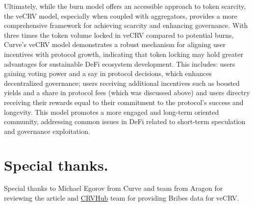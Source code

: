 \documentclass[notitlepage]{revtex4-2}
\begin{document}
Ultimately, while the burn model offers an accessible approach to token scarcity, the veCRV model, especially when
coupled with aggregators, provides a more comprehensive framework for achieving scarcity and enhancing governance.
With three times the token volume locked in veCRV compared to potential burns, Curve’s veCRV model demonstrates a
robust mechanism for aligning user incentives with protocol growth, indicating that token locking may hold greater
advantages for sustainable DeFi ecosystem development. This includes: users gaining voting power and a say in protocol
decisions, which enhances decentralized governance; users receiving additional incentives such as boosted yields and a
share in protocol fees (which was discussed above) and users directry receiving their rewards equal to their commitment
to the protocol’s success and longevity. This model promotes a more engaged and long-term oriented community,
addressing common issues in DeFi related to short-term speculation and governance exploitation.

\section{Special thanks.}

Special thanks to Michael Egorov from Curve and team from Aragon for reviewing the article and
\href{https://crvhub.com}{CRVHub} team for providing Bribes data for veCRV.
\end{document}
